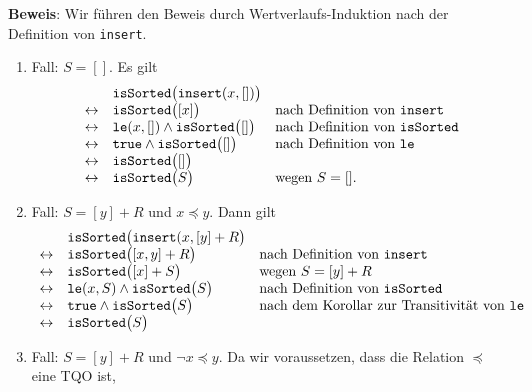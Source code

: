 \noindent
\textbf{Beweis}: Wir f\"uhren den Beweis durch Wertverlaufs-Induktion nach der Definition von \texttt{insert}.
\begin{enumerate}
\item Fall: $S = []$.  Es gilt 
      $$
      \begin{array}{lll}
                      & \mathtt{isSorted}\bigl(\mathtt{insert}(x,[]) \bigr) \\
      \leftrightarrow & \mathtt{isSorted}\bigl([x] \bigr)                        & \mbox{nach Definition von \texttt{insert}} \\
      \leftrightarrow & \mathtt{le}(x,[]) \wedge \mathtt{isSorted}\bigl([]\bigr) & \mbox{nach Definition von \texttt{isSorted}} \\
      \leftrightarrow & \mathtt{true}     \wedge \mathtt{isSorted}\bigl([]\bigr) & \mbox{nach Definition von \texttt{le} } \\
      \leftrightarrow & \mathtt{isSorted}\bigl([]\bigr)                          &                                         \\
      \leftrightarrow & \mathtt{isSorted}\bigl(S\bigr)                           & \mbox{wegen $S=[]$}.                     \\
      \end{array}
      $$
\item Fall: $S = [y] + R$ und $x \preceq y$.  Dann gilt 
            $$
            \begin{array}{cll}
               & \mathtt{isSorted}\bigl( \mathtt{insert}(x, [y] + R\bigr) \\
             \leftrightarrow & \mathtt{isSorted}\bigl( [x,y] + R\bigr)                    & \mbox{nach Definition von $\mathtt{insert}$}\\
             \leftrightarrow & \mathtt{isSorted}\bigl( [x]+ S\bigr)                       & \mbox{wegen $S = [y] + R$ }\\
             \leftrightarrow & \mathtt{le}(x, S) \wedge \mathtt{isSorted}\bigl( S\bigr)   & \mbox{nach Definition von $\mathtt{isSorted}$}\\
             \leftrightarrow & \mathtt{true} \wedge \mathtt{isSorted}\bigl( S\bigr)       & \mbox{nach dem Korollar zur Transitivit\"at von \texttt{le}}\\
             \leftrightarrow & \mathtt{isSorted}\bigl( S\bigr)                              \\
            \end{array}
            $$
\item Fall:  $S = [y] + R$ und $\neg x \preceq y$.  Da wir voraussetzen, dass die Relation $\preceq$ eine \textsc{TQO} ist,

\end{enumerate}
